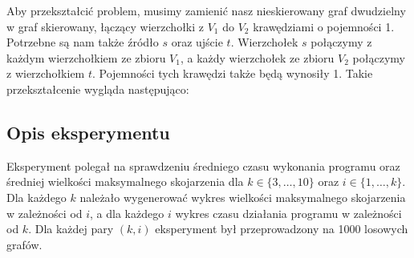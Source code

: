 \documentclass{article}
\begin{document}
Aby przekształcić problem, musimy zamienić nasz nieskierowany graf dwudzielny w graf skierowany, łączący wierzchołki z $V_1$ do $V_2$ krawędziami o pojemności 1.
Potrzebne są nam także źródło $s$ oraz ujście $t$.
Wierzchołek $s$ połączymy z każdym wierzchołkiem ze zbioru $V_1$, a każdy wierzchołek ze zbioru $V_2$ połączymy z wierzchołkiem $t$.
Pojemności tych krawędzi także będą wynosiły 1.
Takie przekształcenie wygląda następująco:

\begin{center}
\end{center}

\subsection{Opis eksperymentu}
Eksperyment polegał na sprawdzeniu średniego czasu wykonania programu oraz średniej wielkości maksymalnego skojarzenia dla $k \in \{3, \dots, 10\}$ oraz $i \in \{1, \dots, k\}$.
Dla każdego $k$ należało wygenerować wykres wielkości maksymalnego skojarzenia w zależności od $i$, a dla każdego $i$ wykres czasu działania programu w zależności od $k$.
Dla każdej pary $(k, i)$ eksperyment był przeprowadzony na 1000 losowych grafów.
\end{document}
